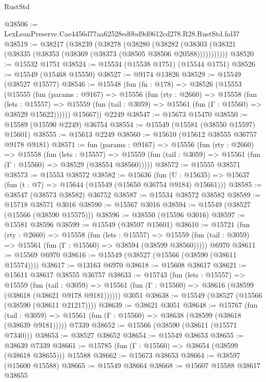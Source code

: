\begin{lexlean}{RustStd}
\begin{coremodule}
@38506 := LexLeanPreserve.Cae4456d77aa62528ed0bd9d0612cd278.R28.RustStd.fal37
@38519 := @38217
    (@38239
      (@38278
        (@38280
          (@38282 (@38303 (@38321 (@38335 (@38353 (@38369 (@38373 (@38505 @38506 @20588)))))))))))
@38520 := @15532 @1751
@38524 := @15534 (@15538 @1751) (@15544 @1751)
@38526 := @15549 (@15468 @15550)
@38527 := @9174 @13826
@38529 := @15549 (@38527 @15577)
@38546 := @15548
    (fun (fn : @178) =>
    @38526
      (@15553
        (@15555
          (fun (params : @9167) =>
          @15556
            (fun (rty : @2660) =>
            @15558
              (fun (lets : @15557) =>
              @15559 (fun (tail : @3059) => @15561 (fun (Γ : @15560) => @38529 @15622))))))
        @15667))
    @2249
@38547 := @15673 @15470
@38550 := @15589 (@15590 @2249) @36754
@38554 := @15549 (@15581 (@38550 @15597) @15601)
@38555 := @15613 @2249
@38560 := @15610 (@15612 @38555 @36757 @9178 @9181)
@38571 := fun (params : @9167) =>
  @15556
    (fun (rty : @2660) =>
    @15558
      (fun (lets : @15557) =>
      @15559 (fun (tail : @3059) => @15561 (fun (Γ : @15560) => @38529 (@38554 @38560)))))
@38572 := @15555 @38571
@38573 := @15553 @38572
@38582 := @15636
    (fun (U : @15635) => @15637 (fun (t : @7) => @15644 (@15549 (@15650 @36754 @9184) @15661)))
@38585 := @38547 (@38573 @38582) @36752
@38587 := @15534 @38572 @38582
@38589 := @15718 @38571 @3016
@38590 := @15567 @3016
@38594 := @15549 (@38527 (@15566 (@38590 @15575)))
@38596 := @38550 (@15596 @3016)
@38597 := @15581 @38596
@38599 := @15549 (@38597 @15601)
@38610 := @15721
    (fun (rty : @2660) =>
    @15558
      (fun (lets : @15557) =>
      @15559 (fun (tail : @3059) => @15561 (fun (Γ : @15560) => @38594 (@38599 @38560)))))
    @6970
@38611 := @15569 @6970
@38616 := @15549 (@38527 (@15566 (@38590 (@38611 @15574))))
@38617 := @13163 @6970
@38618 := @15608 @38617
@38621 := @15611 @38617 @38555 @36757
@38633 := @15743
    (fun (lets : @15557) =>
    @15559
      (fun (tail : @3059) =>
      @15561 (fun (Γ : @15560) => @38616 (@38599 (@38618 (@38621 @9178 @9181))))))
    @3051
@38638 := @15549 (@38527 (@15566 (@38590 (@38611 @21217))))
@38639 := @38621 @3051
@38648 := @15767
    (fun (tail : @3059) => @15561 (fun (Γ : @15560) => @38638 (@38599 (@38618 (@38639 @9181)))))
    @7339
@38652 := @15566 (@38590 (@38611 (@15571 @7340)))
@38653 := @38527 @38652
@38654 := @15549 @38653
@38655 := @38639 @7339
@38661 := @15785 (fun (Γ : @15560) => @38654 (@38599 (@38618 @38655))) @15588
@38662 := @15673 @38653
@38664 := @38597 (@15600 @15588)
@38665 := @15549 @38664
@38668 := @15607 @15588 @38617 @38655

\end{coremodule}
\end{lexlean}
